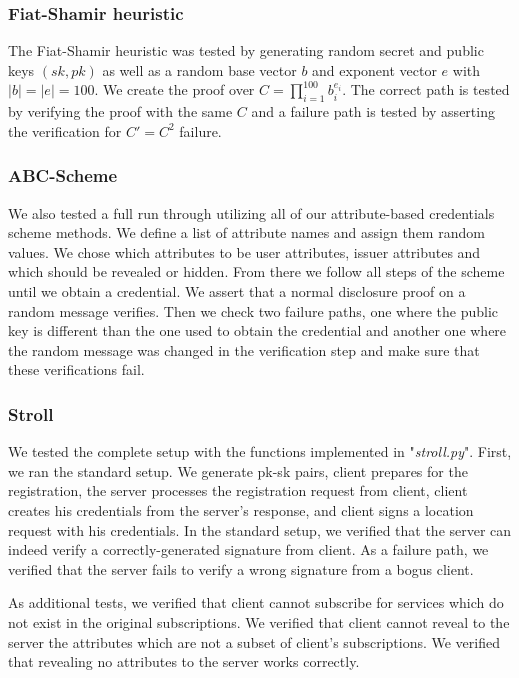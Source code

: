 \documentclass[9pt,conference]{IEEEtran}
\begin{document}
\subsubsection{Fiat-Shamir heuristic}
The Fiat-Shamir heuristic was tested by generating random secret and public keys $(sk, pk)$ as well as a random base vector $b$ and exponent vector $e$ with $|b| = |e| = 100$. We create the proof over ${C = \prod_{i=1}^{100}b_i ^{e_i}}$. The correct path is tested by verifying the proof with the same $C$ and a failure path is tested by asserting the verification for $C' = C^2$ failure.

\subsubsection{ABC-Scheme}
We also tested a full run through utilizing all of our attribute-based credentials scheme methods. We define a list of attribute names and assign them random values. We chose which attributes to be user attributes, issuer attributes and which should be revealed or hidden. From there we follow all steps of the scheme until we obtain a credential. We assert that a normal disclosure proof on a random message verifies. Then we check two failure paths, one where the public key is different than the one used to obtain the credential and another one where the random message was changed in the verification step and make sure that these verifications fail.

\subsubsection{Stroll}
We tested the complete setup with the functions implemented in "\textit{stroll.py}". First, we ran the standard setup. We generate pk-sk pairs, client prepares for the registration, the server processes the registration request from client, client creates his credentials from the server's response, and client signs a location request with his credentials. In the standard setup, we verified that the server can indeed verify a correctly-generated signature from client. As a failure path, we verified that the server fails to verify a wrong signature from a bogus client.

As additional tests, we verified that client cannot subscribe for services which do not exist in the original subscriptions. We verified that client cannot reveal to the server the attributes which are not a subset of client's subscriptions. We verified that revealing no attributes to the server works correctly.
\end{document}
